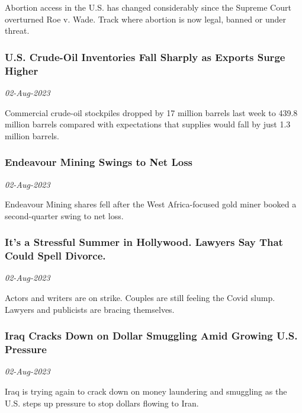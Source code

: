Abortion access in the U.S. has changed considerably since the Supreme Court overturned Roe v. Wade. Track where abortion is now legal, banned or under threat.
\subsubsection{U.S. Crude-Oil Inventories Fall Sharply as Exports Surge Higher \href{https://www.wsj.com/articles/u-s-crude-oil-inventories-fall-sharply-as-exports-surge-higher-add2d9a2}{}}
\textit{02-Aug-2023}

Commercial crude-oil stockpiles dropped by 17 million barrels last week to 439.8 million barrels compared with expectations that supplies would fall by just 1.3 million barrels.
\subsubsection{Endeavour Mining Swings to Net Loss \href{https://www.wsj.com/articles/market-talk-roundup-endeavour-mining-bottoms-ftse-100-after-swing-to-net-loss-60a3fd02}{}}
\textit{02-Aug-2023}

Endeavour Mining shares fell after the West Africa-focused gold miner booked a second-quarter swing to net loss.
\subsubsection{It's a Stressful Summer in Hollywood. Lawyers Say That Could Spell Divorce. \href{https://www.wsj.com/articles/celebrity-divorces-lawyers-ariana-grande-dalton-gomez-e59ae7b9}{}}
\textit{02-Aug-2023}

Actors and writers are on strike. Couples are still feeling the Covid slump. Lawyers and publicists are bracing themselves.
\subsubsection{Iraq Cracks Down on Dollar Smuggling Amid Growing U.S. Pressure \href{https://www.wsj.com/articles/iraq-cracks-down-on-dollar-smuggling-amid-growing-u-s-pressure-8f884e34}{}}
\textit{02-Aug-2023}

Iraq is trying again to crack down on money laundering and smuggling as the U.S. steps up pressure to stop dollars flowing to Iran.
